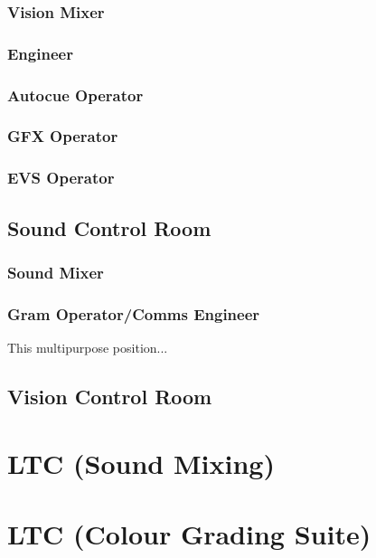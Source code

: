 \documentclass{report}
\begin{document}
\subsubsection{Vision Mixer}
\subsubsection{Engineer}
\subsubsection{Autocue Operator}
\subsubsection{GFX Operator}
\subsubsection{EVS Operator}
\subsection{Sound Control Room}
\subsubsection{Sound Mixer}
\subsubsection{Gram Operator/Comms Engineer}
This multipurpose position...
\subsection{Vision Control Room}
\section{LTC (Sound Mixing)}
\section{LTC (Colour Grading Suite)}
\end{document}
